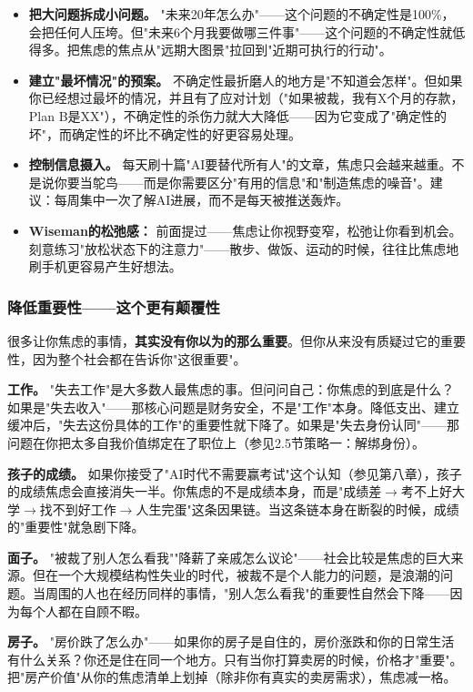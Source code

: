 \documentclass[a4paper,12pt,UTF8]{ctexart}
\begin{document}
\begin{itemize}
\item \textbf{把大问题拆成小问题。} "未来20年怎么办"——这个问题的不确定性是100\%，会把任何人压垮。但"未来6个月我要做哪三件事"——这个问题的不确定性就低得多。把焦虑的焦点从"远期大图景"拉回到"近期可执行的行动"。
\item \textbf{建立"最坏情况"的预案。} 不确定性最折磨人的地方是"不知道会怎样"。但如果你已经想过最坏的情况，并且有了应对计划（"如果被裁，我有X个月的存款，Plan B是XX"），不确定性的杀伤力就大大降低——因为它变成了"确定性的坏"，而确定性的坏比不确定性的好更容易处理。
\item \textbf{控制信息摄入。} 每天刷十篇"AI要替代所有人"的文章，焦虑只会越来越重。不是说你要当鸵鸟——而是你需要区分"有用的信息"和"制造焦虑的噪音"。建议：每周集中一次了解AI进展，而不是每天被推送轰炸。
\item \textbf{Wiseman的松弛感：} 前面提过——焦虑让你视野变窄，松弛让你看到机会。刻意练习"放松状态下的注意力"——散步、做饭、运动的时候，往往比焦虑地刷手机更容易产生好想法。
\end{itemize}

\subsubsection{降低重要性——这个更有颠覆性}

很多让你焦虑的事情，\textbf{其实没有你以为的那么重要}。但你从来没有质疑过它的重要性，因为整个社会都在告诉你"这很重要"。

\textbf{工作。} "失去工作"是大多数人最焦虑的事。但问问自己：你焦虑的到底是什么？如果是"失去收入"——那核心问题是财务安全，不是"工作"本身。降低支出、建立缓冲后，"失去这份具体的工作"的重要性就下降了。如果是"失去身份认同"——那问题在你把太多自我价值绑定在了职位上（参见2.5节策略一：解绑身份）。

\textbf{孩子的成绩。} 如果你接受了"AI时代不需要赢考试"这个认知（参见第八章），孩子的成绩焦虑会直接消失一半。你焦虑的不是成绩本身，而是"成绩差$\to$考不上好大学$\to$找不到好工作$\to$人生完蛋"这条因果链。当这条链本身在断裂的时候，成绩的"重要性"就急剧下降。

\textbf{面子。} "被裁了别人怎么看我""降薪了亲戚怎么议论"——社会比较是焦虑的巨大来源。但在一个大规模结构性失业的时代，被裁不是个人能力的问题，是浪潮的问题。当周围的人也在经历同样的事情，"别人怎么看我"的重要性自然会下降——因为每个人都在自顾不暇。

\textbf{房子。} "房价跌了怎么办"——如果你的房子是自住的，房价涨跌和你的日常生活有什么关系？你还是住在同一个地方。只有当你打算卖房的时候，价格才"重要"。把"房产价值"从你的焦虑清单上划掉（除非你有真实的卖房需求），焦虑减一格。
\end{document}
